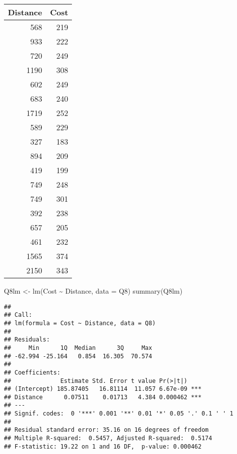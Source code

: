 \documentclass[
]{article}
\newenvironment{Shaded}{\begin{snugshade}}{\end{snugshade}}
\newcommand{\AttributeTok}[1]{\textcolor[rgb]{0.77,0.63,0.00}{#1}}
\newcommand{\FunctionTok}[1]{\textcolor[rgb]{0.00,0.00,0.00}{#1}}
\newcommand{\NormalTok}[1]{#1}
\newcommand{\OtherTok}[1]{\textcolor[rgb]{0.56,0.35,0.01}{#1}}
\newcommand{\SpecialCharTok}[1]{\textcolor[rgb]{0.00,0.00,0.00}{#1}}
\newcommand{\StringTok}[1]{\textcolor[rgb]{0.31,0.60,0.02}{#1}}
\begin{document}
\begin{longtable}[]{@{}rr@{}}
\toprule
Distance & Cost \\
\midrule
\endhead
568 & 219 \\
933 & 222 \\
720 & 249 \\
1190 & 308 \\
602 & 249 \\
683 & 240 \\
1719 & 252 \\
589 & 229 \\
327 & 183 \\
894 & 209 \\
419 & 199 \\
749 & 248 \\
749 & 301 \\
392 & 238 \\
657 & 205 \\
461 & 232 \\
1565 & 374 \\
2150 & 343 \\
\bottomrule
\end{longtable}

\begin{Shaded}
\begin{Highlighting}[]
\NormalTok{Q8lm }\OtherTok{\textless{}{-}} \FunctionTok{lm}\NormalTok{(Cost }\SpecialCharTok{\textasciitilde{}}\NormalTok{ Distance, }\AttributeTok{data =}\NormalTok{ Q8)}
\FunctionTok{summary}\NormalTok{(Q8lm)}
\end{Highlighting}
\end{Shaded}

\begin{verbatim}
## 
## Call:
## lm(formula = Cost ~ Distance, data = Q8)
## 
## Residuals:
##     Min      1Q  Median      3Q     Max 
## -62.994 -25.164   0.854  16.305  70.574 
## 
## Coefficients:
##              Estimate Std. Error t value Pr(>|t|)    
## (Intercept) 185.87405   16.81114  11.057 6.67e-09 ***
## Distance      0.07511    0.01713   4.384 0.000462 ***
## ---
## Signif. codes:  0 '***' 0.001 '**' 0.01 '*' 0.05 '.' 0.1 ' ' 1
## 
## Residual standard error: 35.16 on 16 degrees of freedom
## Multiple R-squared:  0.5457, Adjusted R-squared:  0.5174 
## F-statistic: 19.22 on 1 and 16 DF,  p-value: 0.000462
\end{verbatim}

\begin{Shaded}
\end{Shaded}
\end{document}
